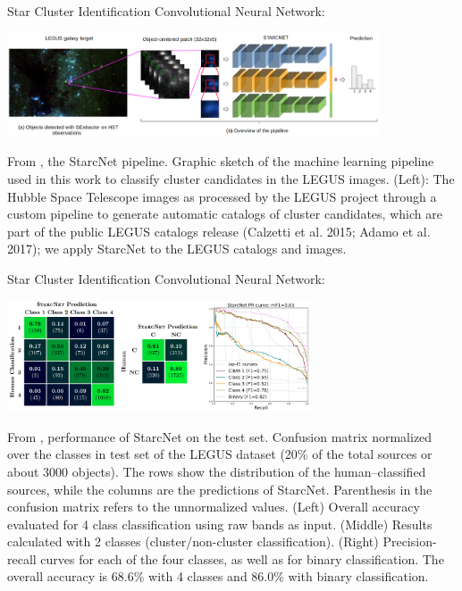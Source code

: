 \documentclass[10pt]{beamer}
\newcommand{\1}{{\mathbbm{1}}}
\begin{document}
\begin{frame}{Star Cluster Identification}
 \pause
Convolutional Neural Network: \pause

\begin{center}

\includegraphics[width=11cm]{img/starcnet2.png} \pause

From \cite{perez_starcnet_2021}, the StarcNet pipeline. \pause Graphic sketch of the machine learning pipeline used in this work to classify cluster
candidates in the LEGUS images. \pause (Left): The Hubble Space Telescope images as processed by the LEGUS project through a custom pipeline to generate automatic catalogs of cluster candidates, which are part of the public LEGUS catalogs release (Calzetti et al. 2015; Adamo et al. 2017); we apply StarcNet to the LEGUS catalogs and images. 

\end{center}

\end{frame}

\begin{frame}{Star Cluster Identification}
 \pause
Convolutional Neural Network: \pause

\begin{center}

\includegraphics[width=9cm]{img/starcnet3.png} \pause

From \cite{perez_starcnet_2021}, performance of StarcNet on the test set. \pause Confusion matrix normalized over the classes in test set of the LEGUS dataset (20\% of the total sources or about 3000 objects). \pause The rows show the distribution of the human–classified sources, while the columns are the predictions of StarcNet. Parenthesis in the confusion matrix refers to the unnormalized values. \pause (Left) Overall accuracy evaluated for 4 class classification using raw bands as input. \pause (Middle) Results calculated with 2 classes (cluster/non-cluster classification). \pause (Right) Precision-recall curves for each of the four classes, as well as for binary classification. \pause The overall accuracy is 68.6\% with 4 classes and 86.0\% with binary classification.

\end{center}

\end{frame}
\end{document}
